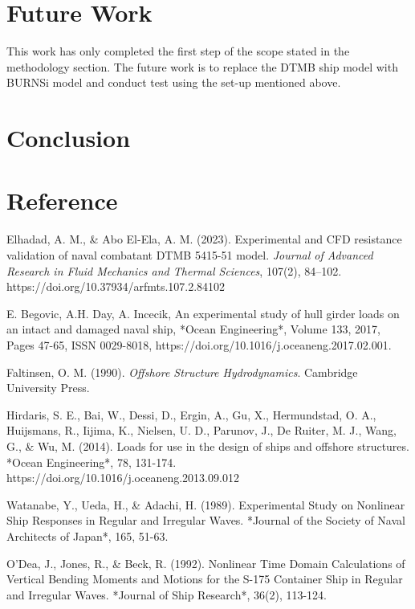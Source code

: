 \documentclass[12pt]{article} %
\begin{document}
\section{Future Work}
This work has only completed the first step of the scope stated in the methodology section. The future work is to replace the DTMB ship model with BURNSi model and conduct
test using the set-up mentioned above.
\section{Conclusion}



\section{Reference}
\begin{thebibliography}{99}
     Elhadad, A. M., \& Abo El-Ela, A. M. (2023). Experimental and CFD resistance validation of naval combatant DTMB 5415-51 model. \textit{Journal of Advanced Research in Fluid Mechanics and Thermal Sciences}, 107(2), 84–102. https://doi.org/10.37934/arfmts.107.2.84102
    
     E. Begovic, A.H. Day, A. Incecik, An experimental study of hull girder loads on an intact and damaged naval ship, *Ocean Engineering*, Volume 133, 2017, Pages 47-65, ISSN 0029-8018, https://doi.org/10.1016/j.oceaneng.2017.02.001.

     Faltinsen, O. M. (1990). \textit{Offshore Structure Hydrodynamics}. Cambridge University Press.

     Hirdaris, S. E., Bai, W., Dessi, D., Ergin, A., Gu, X., Hermundstad, O. A., Huijsmans, R., Iijima, K., Nielsen, U. D., Parunov, J., De Ruiter, M. J., Wang, G., \& Wu, M. (2014). Loads for use in the design of ships and offshore structures. *Ocean Engineering*, 78, 131-174. https://doi.org/10.1016/j.oceaneng.2013.09.012
    
     Watanabe, Y., Ueda, H., \& Adachi, H. (1989). Experimental Study on Nonlinear Ship Responses in Regular and Irregular Waves. *Journal of the Society of Naval Architects of Japan*, 165, 51-63.

     O'Dea, J., Jones, R., \& Beck, R. (1992). Nonlinear Time Domain Calculations of Vertical Bending Moments and Motions for the S-175 Container Ship in Regular and Irregular Waves. *Journal of Ship Research*, 36(2), 113-124.


\end{thebibliography}
\end{document}
